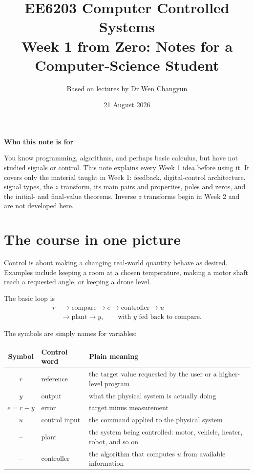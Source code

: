 \documentclass[11pt]{article}
\title{EE6203 Computer Controlled Systems\\
\large Week 1 from Zero: Notes for a Computer-Science Student}
\author{Based on lectures by Dr Wen Changyun}
\date{21 August 2026}
\newenvironment{keybox}[1]
  {\begin{center}\begin{lrbox}{\notebox}\begin{minipage}{0.91\linewidth}\small\textbf{#1}\par\smallskip}
  {\end{minipage}\end{lrbox}\fcolorbox{blue!55!black}{blue!4}{\usebox{\notebox}}\end{center}}
\begin{document}
\maketitle

\begin{keybox}{Who this note is for}
You know programming, algorithms, and perhaps basic calculus, but have not studied signals or control. This note explains every Week 1 idea before using it. It covers only the material taught in Week 1: feedback, digital-control architecture, signal types, the $z$ transform, its main pairs and properties, poles and zeros, and the initial- and final-value theorems. Inverse $z$ transforms begin in Week 2 and are not developed here.
\end{keybox}

\tableofcontents
\newpage

\section{The course in one picture}

Control is about making a changing real-world quantity behave as desired. Examples include keeping a room at a chosen temperature, making a motor shaft reach a requested angle, or keeping a drone level.

The basic loop is
\[
\begin{aligned}
\boxed{r}&\longrightarrow
\boxed{\text{compare}}\longrightarrow
\boxed{e}\longrightarrow
\boxed{\text{controller}}\longrightarrow
\boxed{u}\\
&\longrightarrow\boxed{\text{plant}}\longrightarrow\boxed{y},
\qquad \text{with }y\text{ fed back to compare.}
\end{aligned}
\]

The symbols are simply names for variables:

\begin{center}
\begin{tabular}{c p{} p{}}
\toprule
Symbol & Control word & Plain meaning\\
\midrule
$r$ & reference & the target value requested by the user or a higher-level program\\
$y$ & output & what the physical system is actually doing\\
$e=r-y$ & error & target minus measurement\\
$u$ & control input & the command applied to the physical system\\
-- & plant & the system being controlled: motor, vehicle, heater, robot, and so on\\
-- & controller & the algorithm that computes $u$ from available information\\
\bottomrule
\end{tabular}
\end{center}
\end{document}
